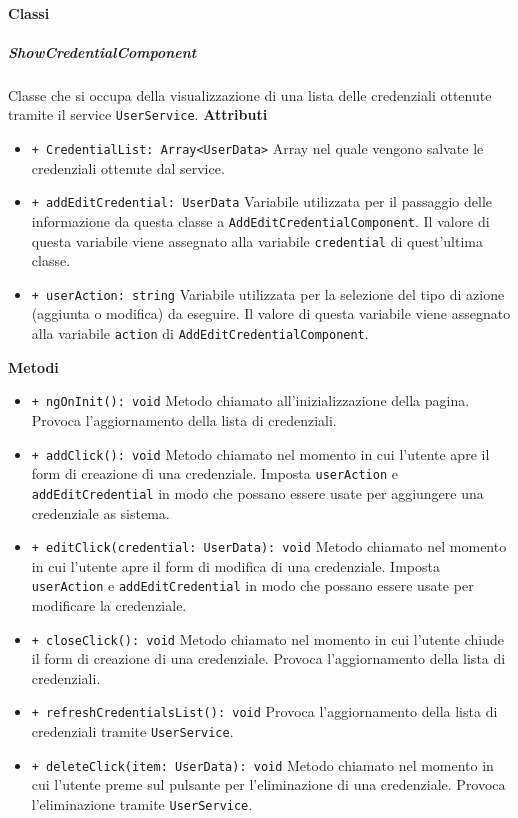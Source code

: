 \paragraph{Classi}
\subparagraph{ShowCredentialComponent}
Classe che si occupa della visualizzazione di una lista delle credenziali ottenute tramite il service \texttt{UserService}. \newline
\textbf{Attributi}
\begin{itemize}
	\item \texttt{+ CredentialList: Array<UserData>} \newline
	Array nel quale vengono salvate le credenziali ottenute dal service.
	\item \texttt{+ addEditCredential: UserData} \newline
	Variabile utilizzata per il passaggio delle informazione da questa classe a \texttt{AddEditCredentialComponent}. Il valore di questa variabile viene assegnato alla variabile \texttt{credential} di quest'ultima classe.
	\item \texttt{+ userAction: string} \newline
	Variabile utilizzata per la selezione del tipo di azione (aggiunta o modifica) da eseguire. Il valore di questa variabile viene assegnato alla variabile \texttt{action} di \texttt{AddEditCredentialComponent}.
\end{itemize}
\textbf{Metodi}
\begin{itemize}
	\item \texttt{+ ngOnInit(): void} \newline
	Metodo chiamato all'inizializzazione della pagina. Provoca l'aggiornamento della lista di credenziali.
	\item \texttt{+ addClick(): void} \newline
	Metodo chiamato nel momento in cui l'utente apre il form di creazione di una credenziale. Imposta \texttt{userAction} e \texttt{addEditCredential} in modo che possano essere usate per aggiungere una credenziale as sistema.
	\item \texttt{+ editClick(credential: UserData): void} \newline
	Metodo chiamato nel momento in cui l'utente apre il form di modifica di una credenziale. Imposta \texttt{userAction} e \texttt{addEditCredential} in modo che possano essere usate per modificare la credenziale.
	\item \texttt{+ closeClick(): void} \newline
	Metodo chiamato nel momento in cui l'utente chiude il form di creazione di una credenziale. Provoca l'aggiornamento della lista di credenziali.
	\item \texttt{+ refreshCredentialsList(): void} \newline
	Provoca l'aggiornamento della lista di credenziali tramite \texttt{UserService}.
	\item \texttt{+ deleteClick(item: UserData): void} \newline
	Metodo chiamato nel momento in cui l'utente preme sul pulsante per l'eliminazione di una credenziale. Provoca l'eliminazione tramite \texttt{UserService}.
\end{itemize}
